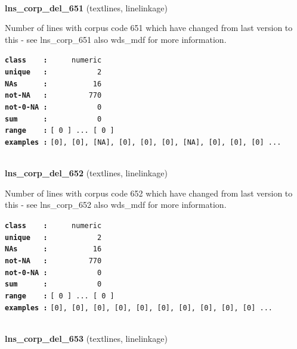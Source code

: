 \documentclass[]{article}
\begin{document}
~

\textbf{lns\_corp\_del\_651} (textlines, linelinkage)

Number of lines with corpus code 651 which have changed from last
version to this - see lns\_corp\_651 also wds\_mdf for more information.

\textbf{\texttt{class\ \ \ \ :}} \texttt{~~~~~numeric}\\
\textbf{\texttt{unique\ \ \ :}} \texttt{~~~~~~~~~~~2}\\
\textbf{\texttt{NAs\ \ \ \ \ \ :}} \texttt{~~~~~~~~~~16}\\
\textbf{\texttt{not-NA\ \ \ :}} \texttt{~~~~~~~~~770}\\
\textbf{\texttt{not-0-NA\ :}} \texttt{~~~~~~~~~~~0}\\
\textbf{\texttt{sum\ \ \ \ \ \ :}} \texttt{~~~~~~~~~~~0}\\
\textbf{\texttt{range\ \ \ \ :}}
\texttt{{[}\ 0\ {]}\ ...\ {[}\ 0\ {]}}\\
\textbf{\texttt{examples\ :}}
\texttt{{[}0{]},\ {[}0{]},\ {[}NA{]},\ {[}0{]},\ {[}0{]},\ {[}0{]},\ {[}NA{]},\ {[}0{]},\ {[}0{]},\ {[}0{]}\ ...}\\

~

\textbf{lns\_corp\_del\_652} (textlines, linelinkage)

Number of lines with corpus code 652 which have changed from last
version to this - see lns\_corp\_652 also wds\_mdf for more information.

\textbf{\texttt{class\ \ \ \ :}} \texttt{~~~~~numeric}\\
\textbf{\texttt{unique\ \ \ :}} \texttt{~~~~~~~~~~~2}\\
\textbf{\texttt{NAs\ \ \ \ \ \ :}} \texttt{~~~~~~~~~~16}\\
\textbf{\texttt{not-NA\ \ \ :}} \texttt{~~~~~~~~~770}\\
\textbf{\texttt{not-0-NA\ :}} \texttt{~~~~~~~~~~~0}\\
\textbf{\texttt{sum\ \ \ \ \ \ :}} \texttt{~~~~~~~~~~~0}\\
\textbf{\texttt{range\ \ \ \ :}}
\texttt{{[}\ 0\ {]}\ ...\ {[}\ 0\ {]}}\\
\textbf{\texttt{examples\ :}}
\texttt{{[}0{]},\ {[}0{]},\ {[}0{]},\ {[}0{]},\ {[}0{]},\ {[}0{]},\ {[}0{]},\ {[}0{]},\ {[}0{]},\ {[}0{]}\ ...}\\

~

\textbf{lns\_corp\_del\_653} (textlines, linelinkage)
\end{document}
